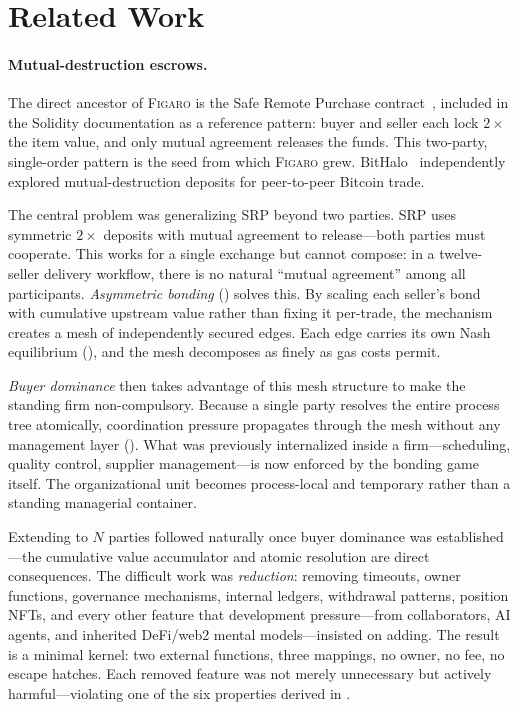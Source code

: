 \documentclass[11pt,a4paper]{article}
\theoremstyle{definition}
\theoremstyle{remark}
\newcommand{\figaro}{\textsc{Figaro}}
\begin{document}
\section{Related Work}
\label{sec:related}

\paragraph{Mutual-destruction escrows.}
The direct ancestor of \figaro{} is the Safe Remote Purchase
contract~\citep{buterin2016}, included in the Solidity documentation as
a reference pattern: buyer and seller each lock $2\times$ the item
value, and only mutual agreement releases the funds. This two-party,
single-order pattern is the seed from which \figaro{} grew.
BitHalo~\citep{bithalo2014} independently explored mutual-destruction
deposits for peer-to-peer Bitcoin trade.

The central problem was generalizing SRP beyond two parties. SRP uses
symmetric $2\times$ deposits with mutual agreement to release---both
parties must cooperate. This works for a single exchange but cannot
compose: in a twelve-seller delivery workflow, there is no natural
``mutual agreement'' among all participants. \emph{Asymmetric bonding}
() solves this. By scaling each seller's
bond with cumulative upstream value rather than fixing it per-trade,
the mechanism creates a mesh of independently secured edges. Each edge
carries its own Nash equilibrium (), and the
mesh decomposes as finely as gas costs permit.

\emph{Buyer dominance} then takes advantage of this mesh structure to
make the standing firm non-compulsory. Because a single party resolves
the entire process tree atomically, coordination pressure propagates
through the mesh without any management layer
(). What was previously internalized
inside a firm---scheduling, quality control, supplier
management---is now enforced by the bonding game itself. The
organizational unit becomes process-local and temporary rather than a
standing managerial container.

Extending to $N$ parties followed naturally once buyer dominance was
established---the cumulative value accumulator and atomic resolution
are direct consequences. The difficult work was \emph{reduction}:
removing timeouts, owner functions, governance mechanisms, internal
ledgers, withdrawal patterns, position NFTs, and every other feature
that development pressure---from collaborators, AI agents, and
inherited DeFi/web2 mental models---insisted on adding. The result is
a minimal kernel: two external functions, three mappings, no owner, no
fee, no escape hatches. Each removed feature was not merely unnecessary
but actively harmful---violating one of the six properties derived in
.
\end{document}
